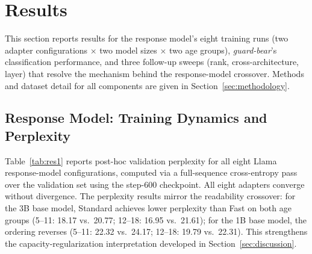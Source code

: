 \documentclass[pdflatex,sn-mathphys-num]{sn-jnl}%
\begin{document}
\section{Results}\label{sec2}

This section reports results for the response model's eight training runs (two adapter configurations $\times$ two model sizes $\times$ two age groups), \textit{guard-bear}'s classification performance, and three follow-up sweeps (rank, cross-architecture, layer) that resolve the mechanism behind the response-model crossover. Methods and dataset detail for all components are given in Section~\ref{sec:methodology}.

\subsection{Response Model: Training Dynamics and Perplexity}

Table~\ref{tab:res1} reports post-hoc validation perplexity for all eight Llama response-model configurations, computed via a full-sequence cross-entropy pass over the validation set using the step-600 checkpoint. All eight adapters converge without divergence. The perplexity results mirror the readability crossover: for the 3B base model, Standard achieves lower perplexity than Fast on both age groups (5--11: 18.17 vs.\ 20.77; 12--18: 16.95 vs.\ 21.61); for the 1B base model, the ordering reverses (5--11: 22.32 vs.\ 24.17; 12--18: 19.79 vs.\ 22.31). This strengthens the capacity-regularization interpretation developed in Section~\ref{sec:discussion}.
\end{document}
